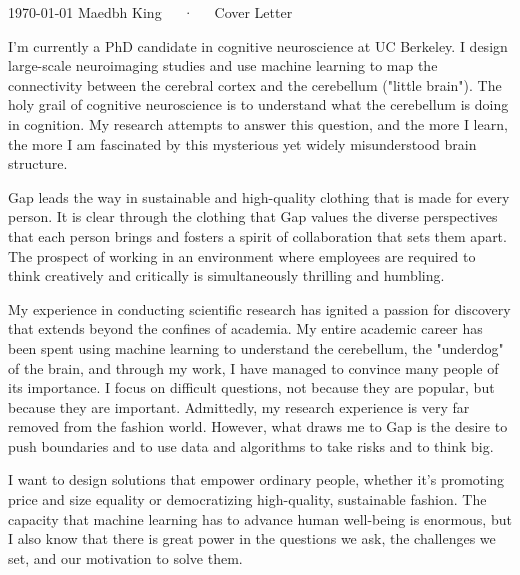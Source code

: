 \documentclass[11pt, a4paper]{maedbh-cv}
\begin{document}
\makecvheader[R]

\makecvfooter
  {\today}
  {Maedbh King~~~·~~~Cover Letter}
  {}

\makelettertitle

\begin{cvletter}

I'm currently a PhD candidate in cognitive neuroscience at UC Berkeley. I design large-scale neuroimaging studies and use machine learning to map the connectivity between the cerebral cortex and the cerebellum ("little brain"). The holy grail of cognitive neuroscience is to understand what the cerebellum is doing in cognition. My research attempts to answer this question, and the more I learn, the more I am fascinated by this mysterious yet widely misunderstood brain structure.

Gap leads the way in sustainable and high-quality clothing that is made for every person. It is clear through the clothing that Gap values the diverse perspectives that each person brings and fosters a spirit of collaboration that sets them apart. The prospect of working in an environment where employees are required to think creatively and critically is simultaneously thrilling and humbling.

My experience in conducting scientific research has ignited a passion for discovery that extends beyond the confines of academia. My entire academic career has been spent using machine learning to understand the cerebellum, the "underdog" of the brain, and through my work, I have managed to convince many people of its importance. I focus on difficult questions, not because they are popular, but because they are important. Admittedly, my research experience is very far removed from the fashion world. However, what draws me to Gap is the desire to push boundaries and to use data and algorithms to take risks and to think big.

I want to design solutions that empower ordinary people, whether it's promoting price and size equality or democratizing high-quality, sustainable fashion. The capacity that machine learning has to advance human well-being is enormous, but I also know that there is great power in the questions we ask, the challenges we set, and our motivation to solve them.


\end{cvletter}


\makeletterclosing
\end{document}
